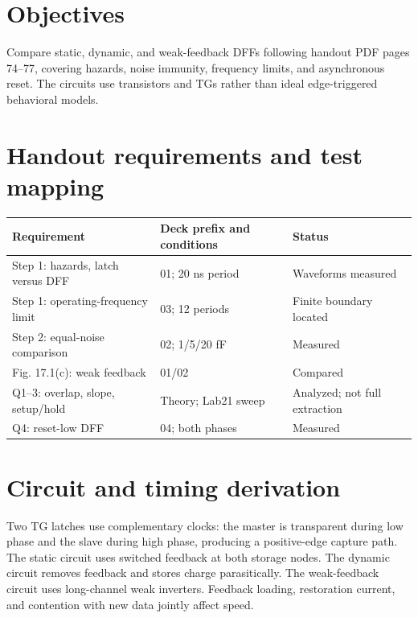 \section{Objectives}

Compare static, dynamic, and weak-feedback DFFs following handout PDF pages 74--77, covering hazards, noise immunity, frequency limits, and asynchronous reset. The circuits use transistors and TGs rather than ideal edge-triggered behavioral models.

\section{Handout requirements and test mapping}

\begin{center}
\small
\setlength{\tabcolsep}{4pt}
\begin{tabular}{p{.42\linewidth}p{.29\linewidth}p{.18\linewidth}}
\toprule
Requirement & Deck prefix and conditions & Status \\
\midrule
Step 1: hazards, latch versus DFF & 01; 20 ns period & Waveforms measured \\
Step 1: operating-frequency limit & 03; 12 periods & Finite boundary located \\
Step 2: equal-noise comparison & 02; 1/5/20 fF & Measured \\
Fig. 17.1(c): weak feedback & 01/02 & Compared \\
Q1--3: overlap, slope, setup/hold & Theory; Lab21 sweep & Analyzed; not full extraction \\
Q4: reset-low DFF & 04; both phases & Measured \\
\bottomrule
\end{tabular}
\end{center}

\section{Circuit and timing derivation}

Two TG latches use complementary clocks: the master is transparent during low phase and the slave during high phase, producing a positive-edge capture path. The static circuit uses switched feedback at both storage nodes. The dynamic circuit removes feedback and stores charge parasitically. The weak-feedback circuit uses long-channel weak inverters. Feedback loading, restoration current, and contention with new data jointly affect speed.

